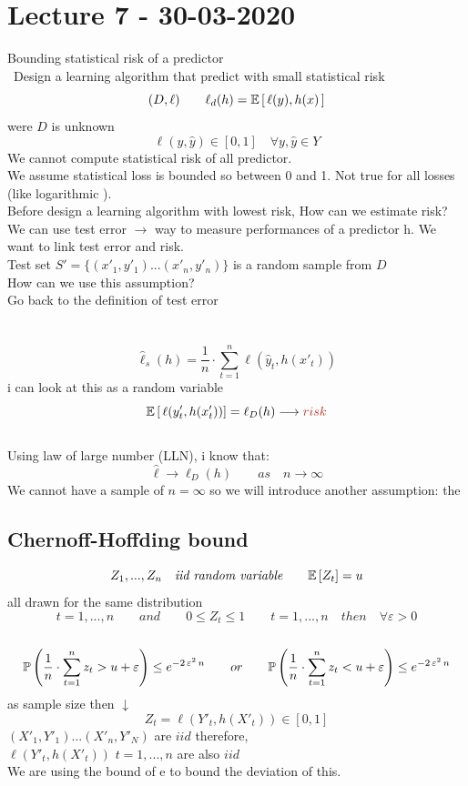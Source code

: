 \documentclass[../main.tex]{subfiles}
\begin{document}
\chapter{Lecture 7 - 30-03-2020}
Bounding statistical risk of a predictor\\\
Design a learning algorithm that predict with small statistical risk\\
$$
(D,\ell) \qquad \ell_d(h) = \mathbb{E}\left[ \, \ell (y), h(x) \, \right]
$$
were $D$ is unknown
$$
\ell(y, \hat{y}) \in [0,1] \quad \forall y, \hat{y} \in Y
$$
We cannot compute statistical risk of all predictor.\\
We assume statistical loss is bounded so between 0 and 1. Not true for all
losses (like logarithmic ).\\
Before design a learning algorithm with lowest risk, How can we estimate
risk?\\
We can use test error $\rightarrow$ way to measure performances of a predictor h.
We want to link test error and risk.
\\
Test set $S' = \{ (x'_1, y'_1) ...(x'_n,y'_n) \}$ is a random sample from $D$
\\
How can we use this assumption?\\
Go back to the definition of test error\\
\\
\\
$$
\hat{\ell}_s(h) = \frac{1}{n} \cdot \sum_{t=1}^{n} \ell (\hat{y}_t,h(x'_t))
$$
i can look at this as a random variable
\\
$$
\barra{E} \left[ \, \ell (y'_t, h(x'_t)) \right] = \ell_D(h) \longrightarrow \red{risk}
$$\\
Using law of large number (LLN), i know that:
$$
\hat{\ell} \longrightarrow \ell_D(h) \qquad as \quad n \rightarrow \infty
$$
We cannot have a sample of $n = \infty$ so we will introduce another assumption:
the \red{Chernoff-Hoffding bound}

\section{Chernoff-Hoffding bound}
$$
Z_1,...,Z_n \quad \textit{iid random variable} \qquad \mathbb{E}\left[Z_t \right] = u
$$
all drawn for the same distribution 
\\
$$
t = 1, ..., n \qquad and \qquad 0 \leq Z_t \leq 1 \qquad t = 1,...,n \quad then \quad \forall \varepsilon > 0
$$\
$$
\mathbb{P} \left( \frac{1}{n} \cdot \sum_{t=1}^{n} z_t > u + \varepsilon \right) \leq e^{-2 \, \varepsilon^2 \, n} \qquad  or \qquad \mathbb{P} \left( \frac{1}{n} \cdot \sum_{t=1}^{n} z_t < u + \varepsilon \right) \leq e^{-2 \, \varepsilon^2 \, n}
$$
as sample size then $\downarrow$
$$
Z_t = \ell(Y'_t, h(X'_t)) \in \left[0,1\right]
$$
$
(X'_1, Y'_1)...(X'_n, Y'_N)$ are $iid$ therefore, \\ $\ell\left(Y'_t, h\left(X'_t\right)\right)$ \quad $t = 1,...,n $ \quad are also $iid$
\\
We are using the bound of e to bound the deviation of this.
\end{document}
